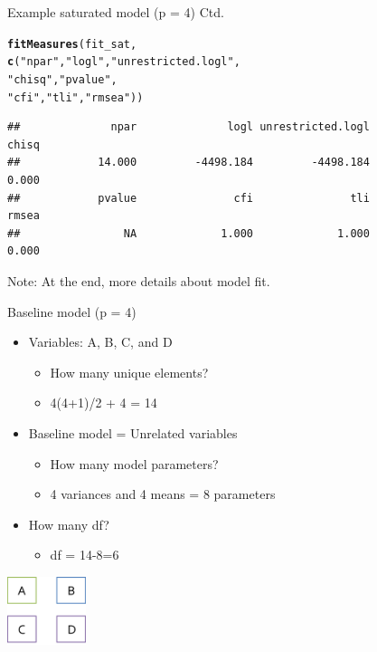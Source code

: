 \documentclass[10pt]{beamer}\usepackage[]{graphicx}\usepackage[]{xcolor}
\makeatletter
\newcommand{\hlstr}[1]{\textcolor[rgb]{0.192,0.494,0.8}{#1}}%
\newcommand{\hlstd}[1]{\textcolor[rgb]{0.345,0.345,0.345}{#1}}%
\newcommand{\hlkwd}[1]{\textcolor[rgb]{0.737,0.353,0.396}{\textbf{#1}}}%
\newenvironment{kframe}{%
 \def\at@end@of@kframe{}%
 \ifinner\ifhmode%
  \def\at@end@of@kframe{\end{minipage}}%
  \begin{minipage}{\columnwidth}%
 \fi\fi%
 \def\FrameCommand##1{\hskip\@totalleftmargin \hskip-\fboxsep
 \colorbox{shadecolor}{##1}\hskip-\fboxsep
     \hskip-\linewidth \hskip-\@totalleftmargin \hskip\columnwidth}%
 \MakeFramed {\advance\hsize-\width
   \@totalleftmargin\z@ \linewidth\hsize
   \@setminipage}}%
 {\par\unskip\endMakeFramed%
 \at@end@of@kframe}
\newenvironment{knitrout}{}{} %
\makeatother
\begin{document}
\begin{frame}[fragile]{Example saturated model (p = 4) Ctd.}

\begin{knitrout}
\color{fgcolor}\begin{kframe}
\begin{alltt}
\hlkwd{fitMeasures}\hlstd{(fit_sat,}
            \hlkwd{c}\hlstd{(}\hlstr{"npar"}\hlstd{,} \hlstr{"logl"}\hlstd{,} \hlstr{"unrestricted.logl"}\hlstd{,}
              \hlstr{"chisq"}\hlstd{,} \hlstr{"pvalue"}\hlstd{,}
              \hlstr{"cfi"}\hlstd{,} \hlstr{"tli"}\hlstd{,} \hlstr{"rmsea"}\hlstd{))}
\end{alltt}
\begin{verbatim}
##              npar              logl unrestricted.logl             chisq 
##            14.000         -4498.184         -4498.184             0.000 
##            pvalue               cfi               tli             rmsea 
##                NA             1.000             1.000             0.000
\end{verbatim}
\end{kframe}
\end{knitrout}

\vspace{5mm}

Note: At the end, more details about model fit.
\end{frame}
%
\begin{frame}[fragile]{Baseline model (p = 4)}

\begin{itemize}
\item{Variables: A, B, C, and D}  
  \begin{itemize}
  \item{How many unique elements?}
  \item{4(4+1)/2 + 4 = 14}
  \end{itemize}
\item{Baseline model = Unrelated variables}
  \begin{itemize}
  \item{How many model parameters?}
  \item{4 variances and 4 means = 8 parameters}
  \end{itemize}
\item{How many df?}
  \begin{itemize}
  \item{df = 14-8=6}
  \end{itemize}
\end{itemize}

\vspace{5mm}

\includegraphics[height=2cm,keepaspectratio=T] {baseline4.png}

\end{frame}
\end{document}
